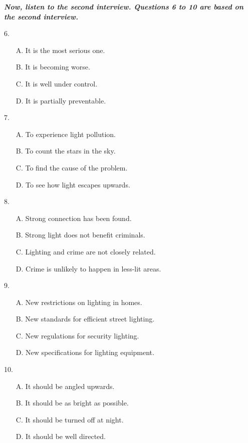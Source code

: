 \documentclass[UTF8,11pt]{ctexart}
\begin{document}
\textbf{\textit{Now, listen to the second interview. Questions 6 to 10 are based on the second interview.}}


6.


\begin{itemize}[leftmargin=2em,itemsep=.2em,topsep=.4em]\item[A.] It is the most serious one.
\item[B.] It is becoming worse.
\item[C.] It is well under control.
\item[D.] It is partially preventable.
\end{itemize}

7.


\begin{itemize}[leftmargin=2em,itemsep=.2em,topsep=.4em]\item[A.] To experience light pollution.
\item[B.] To count the stars in the sky.
\item[C.] To find the cause of the problem.
\item[D.] To see how light escapes upwards.
\end{itemize}

8.


\begin{itemize}[leftmargin=2em,itemsep=.2em,topsep=.4em]\item[A.] Strong connection has been found.
\item[B.] Strong light does not benefit criminals.
\item[C.] Lighting and crime are not closely related.
\item[D.] Crime is unlikely to happen in less-lit areas.
\end{itemize}

9.


\begin{itemize}[leftmargin=2em,itemsep=.2em,topsep=.4em]\item[A.] New restrictions on lighting in homes.
\item[B.] New standards for efficient street lighting.
\item[C.] New regulations for security lighting.
\item[D.] New specifications for lighting equipment.
\end{itemize}

10.


\begin{itemize}[leftmargin=2em,itemsep=.2em,topsep=.4em]\item[A.] It should be angled upwards.
\item[B.] It should be as bright as possible.
\item[C.] It should be turned off at night.
\item[D.] It should be well directed.
\end{itemize}
\end{document}
